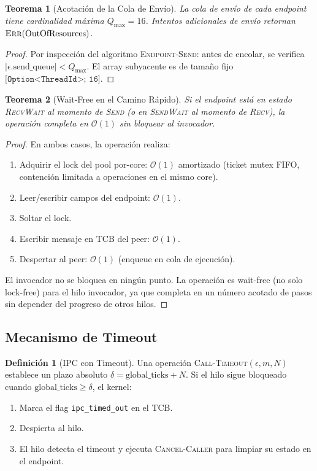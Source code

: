 \documentclass[11pt,twoside,openright]{book}
\theoremstyle{definition}
\newtheorem{definition}{Definición}[chapter]
\theoremstyle{plain}
\newtheorem{theorem}{Teorema}[chapter]
\theoremstyle{remark}
\newcommand{\bigO}{\mathcal{O}}
\begin{document}
\begin{theorem}[Acotación de la Cola de Envío]
\label{thm:bounded-queue}
La cola de envío de cada endpoint tiene cardinalidad máxima $Q_{\max} = 16$. Intentos
adicionales de envío retornan $\textsc{Err}(\text{OutOfResources})$.
\end{theorem}

\begin{proof}
Por inspección del algoritmo \textsc{Endpoint-Send}: antes de encolar, se verifica
$|\epsilon.\text{send\_queue}| < Q_{\max}$. El array subyacente es de tamaño fijo
$\texttt{[Option<ThreadId>; 16]}$.
\end{proof}

\begin{theorem}[Wait-Free en el Camino Rápido]
\label{thm:fast-path}
Si el endpoint está en estado \textsc{RecvWait} al momento de \textsc{Send} (o en
\textsc{SendWait} al momento de \textsc{Recv}), la operación completa en $\bigO(1)$
sin bloquear al invocador.
\end{theorem}

\begin{proof}
En ambos casos, la operación realiza:
\begin{enumerate}
    \item Adquirir el lock del pool por-core: $\bigO(1)$ amortizado (ticket mutex FIFO,
          contención limitada a operaciones en el mismo core).
    \item Leer/escribir campos del endpoint: $\bigO(1)$.
    \item Soltar el lock.
    \item Escribir mensaje en TCB del peer: $\bigO(1)$.
    \item Despertar al peer: $\bigO(1)$ (enqueue en cola de ejecución).
\end{enumerate}
El invocador no se bloquea en ningún punto. La operación es wait-free (no solo lock-free)
para el hilo invocador, ya que completa en un número acotado de pasos sin depender del
progreso de otros hilos.
\end{proof}

\subsection{Mecanismo de Timeout}

\begin{definition}[IPC con Timeout]
\label{def:ipc-timeout}
Una operación \textsc{Call-Timeout}$(\epsilon, m, N)$ establece un plazo absoluto
$\delta = \text{global\_ticks} + N$. Si el hilo sigue bloqueado cuando
$\text{global\_ticks} \geq \delta$, el kernel:
\begin{enumerate}
    \item Marca el flag \texttt{ipc\_timed\_out} en el TCB.
    \item Despierta al hilo.
    \item El hilo detecta el timeout y ejecuta \textsc{Cancel-Caller} para limpiar
          su estado en el endpoint.
\end{enumerate}
\end{definition}
\end{document}
